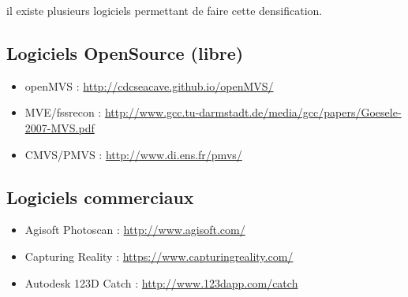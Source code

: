 \documentclass[a4paper,10pt,french]{sphinxhowto}
\begin{document}
il existe plusieurs logiciels permettant de faire cette densification.


\subsection{\textbf{Logiciels OpenSource (libre)}}
\label{mvs:logiciels-opensource-libre}\begin{itemize}
\item {} 
openMVS :  \href{http://cdcseacave.github.io/openMVS/}{http://cdcseacave.github.io/openMVS/}

\item {} 
MVE/fssrecon : \href{http://www.gcc.tu-darmstadt.de/media/gcc/papers/Goesele-2007-MVS.pdf}{http://www.gcc.tu-darmstadt.de/media/gcc/papers/Goesele-2007-MVS.pdf}

\item {} 
CMVS/PMVS : \href{http://www.di.ens.fr/pmvs/}{http://www.di.ens.fr/pmvs/}

\end{itemize}


\subsection{\textbf{Logiciels commerciaux}}
\label{mvs:logiciels-commerciaux}\begin{itemize}
\item {} 
Agisoft Photoscan : \href{http://www.agisoft.com/}{http://www.agisoft.com/}

\item {} 
Capturing Reality : \href{https://www.capturingreality.com/}{https://www.capturingreality.com/}

\item {} 
Autodesk 123D Catch : \href{http://www.123dapp.com/catch}{http://www.123dapp.com/catch}

\end{itemize}
\end{document}
